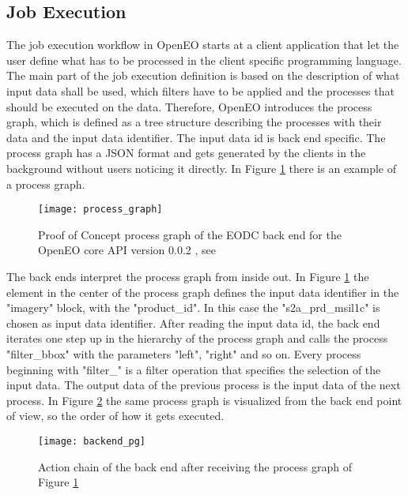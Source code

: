 \documentclass[draft,final]{vutinfth} %
\begin{document}
\subsection{Job Execution}\label{Job Execution}
The job execution workflow in OpenEO starts at a client application that let the user define what has to be processed in the client specific programming language.
The main part of the job execution definition is based on the description of what input data shall be used, which filters have to be applied and the processes that should be executed on the data. Therefore, OpenEO introduces the process graph, which is defined as a tree structure describing the processes with their data and the input data identifier. The input data id is back end specific. The process graph has a JSON format and gets generated by the clients in the background without users noticing it directly. In Figure \ref{fig:process_graph} there is an example of a process graph. 

\begin{figure}[h]
	\centering
	\texttt{[image: process\_graph]}
	\caption{Proof of Concept process graph of the EODC back end for the OpenEO core API version 0.0.2 , see \cite{openeo_api_desc} }
	\label{fig:process_graph} %
\end{figure}

The back ends interpret the process graph from inside out. In Figure \ref{fig:process_graph} the element in the center of the process graph defines the input data identifier in the "imagery" block, with the "product\_id". In this case the "s2a\_prd\_msil1c" is chosen  as input data identifier. After reading the input data id, the back end iterates one step up in the hierarchy of the process graph and calls the process "filter\_bbox" with the parameters "left", "right" and so on. Every process beginning with "filter\_" is a filter operation that specifies the selection of the input data. The output data of the previous process is the input data of the next process. In Figure \ref{fig:process_graph_diagram} the same process graph is visualized from the back end point of view, so the order of how it gets executed. 

\begin{figure}[h]
	\centering
	\texttt{[image: backend\_pg]}
	\caption{Action chain of the back end after receiving the process graph of Figure \ref{fig:process_graph}}
	\label{fig:process_graph_diagram} %
\end{figure}
\end{document}
